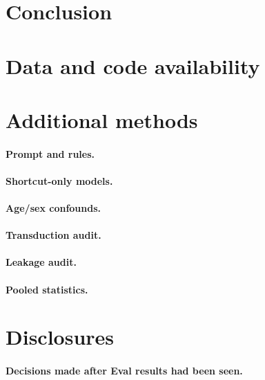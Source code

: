 \documentclass[11pt]{article}
\begin{document}
\section{Conclusion}\label{sec:conclusion}

\section*{Data and code availability}

\clearpage
\appendix

\section{Additional methods}\label{app:methods}

\paragraph{Prompt and rules.}

\paragraph{Shortcut-only models.}

\paragraph{Age/sex confounds.}

\paragraph{Transduction audit.}

\paragraph{Leakage audit.}

\paragraph{Pooled statistics.}

\section{Disclosures}\label{app:disclosures}

\paragraph{Decisions made after Eval results had been seen.}
\end{document}

